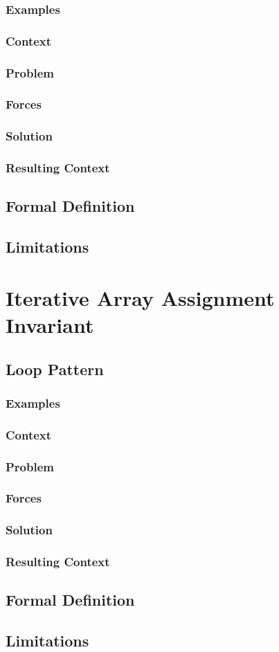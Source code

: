 \subsubsection{Examples}
\subsubsection{Context}
\subsubsection{Problem}
\subsubsection{Forces}
\subsubsection{Solution}
\subsubsection{Resulting Context}

\subsection{Formal Definition}

\subsection{Limitations}

\section{Iterative Array Assignment Invariant}

\subsection{Loop Pattern}

\subsubsection{Examples}
\subsubsection{Context}
\subsubsection{Problem}
\subsubsection{Forces}
\subsubsection{Solution}
\subsubsection{Resulting Context}

\subsection{Formal Definition}

\subsection{Limitations}

